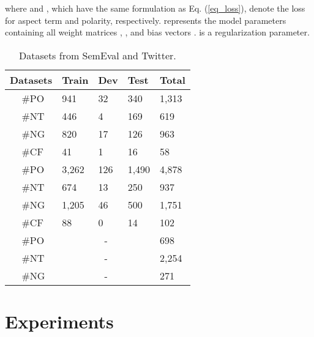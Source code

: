 \documentclass[11pt,a4paper]{article}
\begin{document}
	where  and , which have the same formulation as Eq. (\ref{eq_loss}), denote the loss for aspect term and polarity, respectively.  represents the model parameters containing all weight matrices , ,  and bias vectors .  is a regularization parameter.
	\begin{table}[tp]
		\begin{center}
			\begin{tabular}{|cl|l|l|ll|}
				\hline
				\multicolumn{2}{|c|}{Datasets}    & Train & Dev & \multicolumn{1}{l|}{Test} & Total \\ \hline
				\multirow{4}{*}{}      & \#PO &  941     & 32    & \multicolumn{1}{l|}{340}     & 1,313      \\
											 & \#NT &  446     &  4   & \multicolumn{1}{l|}{169}     & 619      \\
											 & \#NG &  820     &  17   & \multicolumn{1}{l|}{126}     & 963      \\
											 & \#CF &  41     &  1   & \multicolumn{1}{l|}{16}     & 58      \\ \hline
				\multirow{4}{*}{} & \#PO & 3,262      & 126    & \multicolumn{1}{l|}{1,490}     & 4,878      \\
											 & \#NT &  674     &  13   & \multicolumn{1}{l|}{250}     & 937      \\
											 & \#NG &  1,205     & 46    & \multicolumn{1}{l|}{500}     & 1,751      \\ 
											 & \#CF &  88     &  0   & \multicolumn{1}{l|}{14}     & 102      \\ \hline
				\multirow{3}{*}{}     & \#PO & \multicolumn{3}{c|}{-}                   & 698      \\
											 & \#NT & \multicolumn{3}{c|}{-}                   & 2,254      \\
											 & \#NG & \multicolumn{3}{c|}{-}                   & 271      \\ \hline
			\end{tabular}
		\end{center}
		\caption{\label{table-datasets} Datasets from SemEval and Twitter.}
	\end{table}
	
\section{Experiments}
\end{document}
